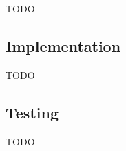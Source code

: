 
TODO

\subsection{Implementation}
\label{sub:main-moni}
TODO


\subsection{Testing}
\label{sub:main-test}
TODO
